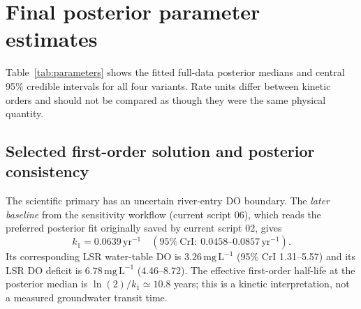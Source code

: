 \documentclass[11pt,a4paper]{article}
\newcommand{\CrI}{\mathrm{CrI}}
\newcommand{\mgL}{\mathrm{mg\,L^{-1}}}
\newcommand{\yr}{\mathrm{yr}}
\begin{document}
\FloatBarrier
\section{Final posterior parameter estimates}
Table~\ref{tab:parameters} shows the fitted full-data posterior medians and central 95\% credible intervals for all four variants. Rate units differ between kinetic orders and should not be compared as though they were the same physical quantity.

\begin{table}[htbp]
\centering\footnotesize
\caption{Earlier full-data posterior CSV summaries (before the later sensitivity-run saved-fit re-summarisation), medians with 95\% credible intervals. River and LSR DO units are $\mgL$; zero-order rates are $\mgL\,\yr^{-1}$ and first-order rates are $\yr^{-1}$. The broad-river first-order fit is the scientific primary.}
\label{tab:parameters}
\end{table}

\subsection{Selected first-order solution and posterior consistency}
The scientific primary has an uncertain river-entry DO boundary. The \emph{later baseline} from the sensitivity workflow (current script 06), which reads the preferred posterior fit originally saved by current script 02, gives
\begin{equation}
 \boxed{k_1=0.0639\,\yr^{-1}\quad(95\%\ \CrI:\ 0.0458\text{--}0.0857\,\yr^{-1}).}
\end{equation}
Its corresponding LSR water-table DO is $3.26\,\mgL$ (95\% CrI 1.31--5.57) and its LSR DO deficit is $6.78\,\mgL$ (4.46--8.72). The effective first-order half-life at the posterior median is $\ln(2)/k_1\simeq10.8$ years; this is a kinetic interpretation, not a measured groundwater transit time.
\end{document}
